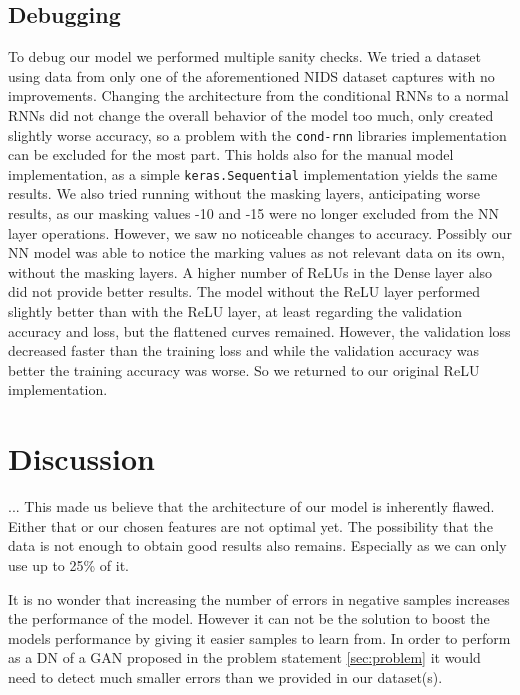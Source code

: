 \documentclass[
	ngerman,
	ruledheaders=section,%
	class=report,%
	thesis={type=bachelor},%
	accentcolor=9c,%
	custommargins=true,%
	marginpar=false,%
	parskip=half-,%
	fontsize=11pt,%
]{tudapub}
\let\code\texttt
\begin{document}

\subsection{Debugging}

To debug our model we performed multiple sanity checks.
We tried a dataset using data from only one of the aforementioned NIDS dataset captures with no improvements.
Changing the architecture from the conditional RNNs to a normal RNNs did not change the overall behavior of the model too much, only created slightly worse accuracy, so a problem with the \code{cond-rnn} libraries implementation can be excluded for the most part.
This holds also for the manual model implementation, as a simple \code{keras.Sequential} implementation yields the same results.
We also tried running without the masking layers, anticipating worse results, as our masking values -10 and -15 were no longer excluded from the NN layer operations.
However, we saw no noticeable changes to accuracy.
Possibly our NN model was able to notice the marking values as not relevant data on its own, without the masking layers.
A higher number of ReLUs in the Dense layer also did not provide better results.
The model without the ReLU layer performed slightly better than with the ReLU layer,
at least regarding the validation accuracy and loss, but the flattened curves remained. %
However, the validation loss decreased faster than the training loss and while the validation accuracy was better the training accuracy was worse.
So we returned to our original ReLU implementation.

\section{Discussion}
\label{sec:exDiscussion}

... This made us believe that the architecture of our model is inherently flawed.
Either that or our chosen features are not optimal yet.
The possibility that the data is not enough to obtain good results also remains.
Especially as we can only use up to 25\% of it.

It is no wonder that increasing the number of errors in negative samples increases the performance of the model.
However it can not be the solution to boost the models performance by giving it easier samples to learn from.
In order to perform as a DN of a GAN proposed in the problem statement \ref{sec:problem} it would need to detect much smaller errors than we provided in our dataset(s).
\end{document}
